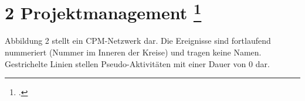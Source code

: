 \documentclass{lehramt-informatik-aufgabe}
\begin{document}
\section{2 Projektmanagement
\footcite[Thema 2 Teilaufgabe 2 Aufgabe 2]{examen:66116:2012:09}
}

Abbildung 2 stellt ein CPM-Netzwerk dar. Die Ereignisse sind fortlaufend
nummeriert (Nummer im Inneren der Kreise) und tragen keine Namen.
Gestrichelte Linien stellen Pseudo-Aktivitäten mit einer Dauer von 0
dar.

\begin{center}
\end{center}
\end{document}
